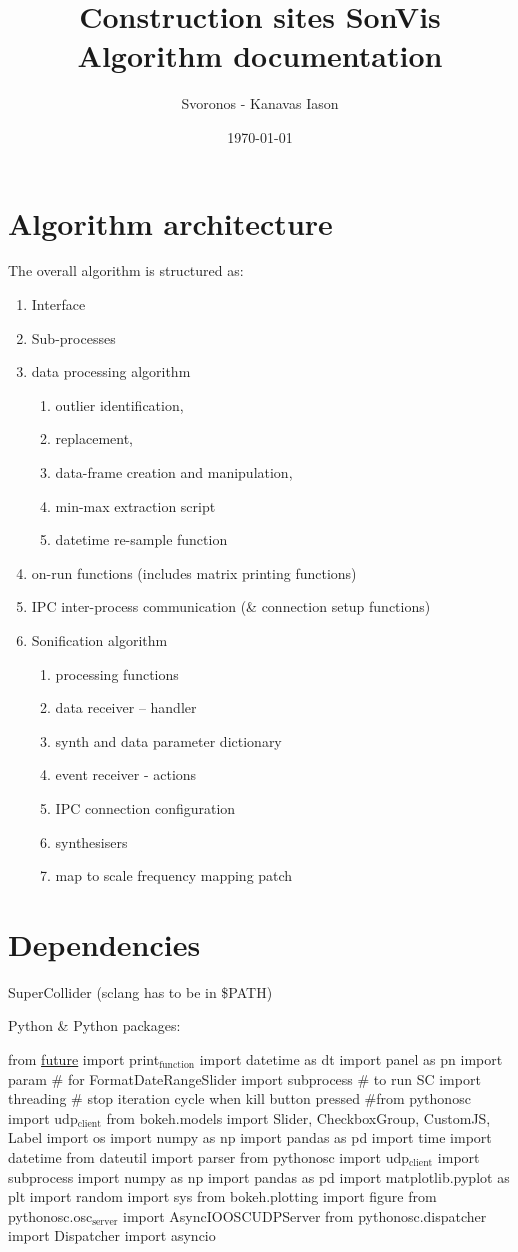 \documentclass[11pt]{article}
\author{Svoronos - Kanavas Iason}
\date{\today}
\title{Construction sites SonVis Algorithm documentation}
\begin{document}
\maketitle
\tableofcontents


\section{Algorithm architecture}
\label{sec:org71f9984}
The overall algorithm is structured as:
\begin{enumerate}
\item Interface
\item Sub-processes
\item data processing algorithm
\begin{enumerate}
\item outlier identification,
\item replacement,
\item data-frame creation and manipulation,
\item min-max extraction script
\item datetime re-sample function
\end{enumerate}
\item on-run functions (includes matrix printing functions)
\item IPC inter-process communication (\& connection setup functions)
\item Sonification algorithm
\begin{enumerate}
\item processing functions
\item data receiver -- handler
\item synth and data parameter dictionary
\item event receiver - actions
\item IPC connection configuration
\item synthesisers
\item map to scale frequency mapping patch
\end{enumerate}
\end{enumerate}

\section{Dependencies}
\label{sec:org897db6e}
SuperCollider (sclang has to be in \$PATH)

Python \&
Python packages:

from \uline{\uline{future}} import print\(_{\text{function}}\)
import datetime as dt
import panel as pn
import param  \# for FormatDateRangeSlider
import subprocess  \# to run SC
import threading  \# stop iteration cycle when kill button pressed
\#from pythonosc import udp\(_{\text{client}}\)
from bokeh.models import Slider, CheckboxGroup, CustomJS, Label
import os
import numpy as np
import pandas as pd
import time
import datetime
from dateutil import parser
from pythonosc import udp\(_{\text{client}}\)
import subprocess
import numpy as np
import pandas as pd
import matplotlib.pyplot as plt
import random
import sys
from bokeh.plotting import figure
from pythonosc.osc\(_{\text{server}}\) import AsyncIOOSCUDPServer
from pythonosc.dispatcher import Dispatcher
import asyncio
\end{document}
